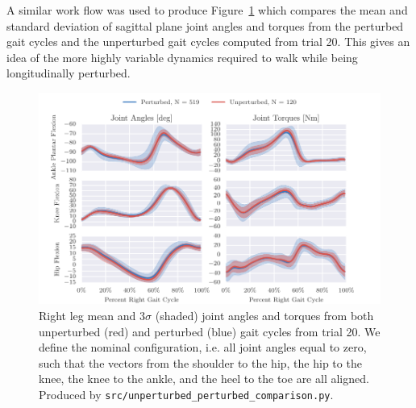 \documentclass[fleqn,12pt]{wlpeerj}
\begin{document}
A similar work flow was used to produce Figure~\ref{fig:angle-torque-comparison}
which compares the mean and standard deviation of sagittal plane joint angles
and torques from the perturbed gait cycles and the unperturbed gait cycles
computed from trial 20. This gives an idea of the more highly variable dynamics
required to walk while being longitudinally perturbed.
%
\begin{figure}
  \centering
  \includegraphics{figures/unperturbed-perturbed-comparison.pdf}
  \cprotect\caption{Right leg mean and $3\sigma$ (shaded) joint angles and
    torques from both unperturbed (red) and perturbed (blue) gait cycles
    from trial 20. We define the nominal configuration, i.e. all joint angles
    equal to zero, such that the vectors from the shoulder to the hip, the hip
    to the knee, the knee to the ankle, and the heel to the toe are all aligned.
    Produced by \verb|src/unperturbed_perturbed_comparison.py|.}
  \label{fig:angle-torque-comparison}
\end{figure}
\end{document}
